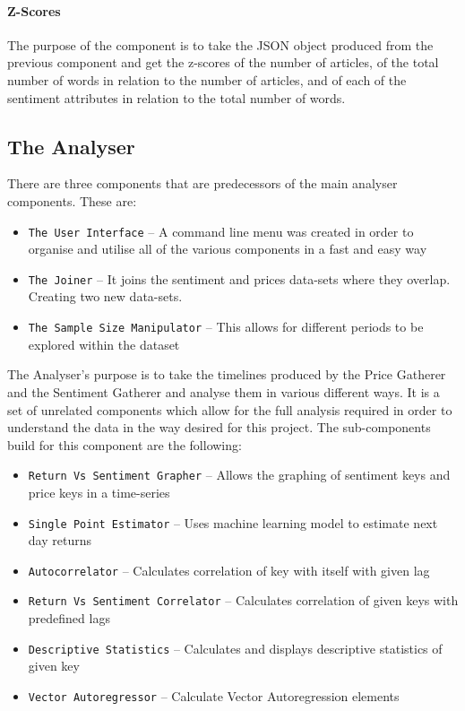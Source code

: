 \paragraph{Z-Scores}

The purpose of the component is to take the JSON object produced from the previous component and get the z-scores of the number of articles, of the total number of words in relation to the number of articles, and of each of the sentiment attributes in relation to the total number of words.

\subsection{The Analyser}

There are three components that are predecessors of the main analyser components. These are:
\begin{itemize}
    \item \texttt{The User Interface} -- A command line menu was created in order to organise and utilise all of the various components in a fast and easy way
    \item \texttt{The Joiner} -- It joins the sentiment and prices data-sets where they overlap. Creating two new data-sets.
    \item \texttt{The Sample Size Manipulator} -- This allows for different periods to be explored within the dataset
\end{itemize}

The Analyser's purpose is to take the timelines produced by the Price Gatherer and the Sentiment Gatherer and analyse them in various different ways. It is a set of unrelated components which allow for the full analysis required in order to understand the data in the way desired for this project. The sub-components build for this component are the following:
\begin{itemize}
    \item \texttt{Return Vs Sentiment Grapher} -- Allows the graphing of sentiment keys and price keys in a time-series
    \item \texttt{Single Point Estimator} -- Uses machine learning model to estimate next day returns
    \item \texttt{Autocorrelator} -- Calculates correlation of key with itself with given lag
    \item \texttt{Return Vs Sentiment Correlator} -- Calculates correlation of given keys with predefined lags
    \item \texttt{Descriptive Statistics} -- Calculates and displays descriptive statistics of given key
    \item \texttt{Vector Autoregressor} -- Calculate Vector Autoregression elements
\end{itemize}

